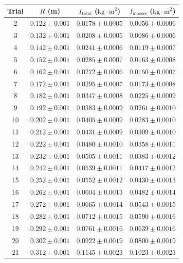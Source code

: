 \documentclass[11pt]{article}
\begin{document}
\begin{table}[h!]
\centering
\small
\begin{tabular}{cccc}
\toprule
\textbf{Trial} & \textbf{$R$ (m)} & \textbf{$I_{\text{total}}$ ($\text{kg}\cdot\text{m}^2$)} & \textbf{$I_{\text{masses}}$ ($\text{kg}\cdot\text{m}^2$)} \\
\midrule
2 & $0.122 \pm 0.001$ & $0.0178 \pm 0.0005$ & $0.0056 \pm 0.0006$ \\
3 & $0.132 \pm 0.001$ & $0.0208 \pm 0.0005$ & $0.0086 \pm 0.0006$ \\
4 & $0.142 \pm 0.001$ & $0.0241 \pm 0.0006$ & $0.0119 \pm 0.0007$ \\
5 & $0.152 \pm 0.001$ & $0.0285 \pm 0.0007$ & $0.0163 \pm 0.0008$ \\
6 & $0.162 \pm 0.001$ & $0.0272 \pm 0.0006$ & $0.0150 \pm 0.0007$ \\
7 & $0.172 \pm 0.001$ & $0.0295 \pm 0.0007$ & $0.0173 \pm 0.0008$ \\
8 & $0.182 \pm 0.001$ & $0.0347 \pm 0.0008$ & $0.0225 \pm 0.0009$ \\
9 & $0.192 \pm 0.001$ & $0.0383 \pm 0.0009$ & $0.0261 \pm 0.0010$ \\
10 & $0.202 \pm 0.001$ & $0.0405 \pm 0.0009$ & $0.0283 \pm 0.0010$ \\
11 & $0.212 \pm 0.001$ & $0.0431 \pm 0.0009$ & $0.0309 \pm 0.0010$ \\
12 & $0.222 \pm 0.001$ & $0.0480 \pm 0.0010$ & $0.0358 \pm 0.0011$ \\
13 & $0.232 \pm 0.001$ & $0.0505 \pm 0.0011$ & $0.0383 \pm 0.0012$ \\
14 & $0.242 \pm 0.001$ & $0.0539 \pm 0.0011$ & $0.0417 \pm 0.0012$ \\
15 & $0.252 \pm 0.001$ & $0.0552 \pm 0.0012$ & $0.0430 \pm 0.0013$ \\
16 & $0.262 \pm 0.001$ & $0.0604 \pm 0.0013$ & $0.0482 \pm 0.0014$ \\
17 & $0.272 \pm 0.001$ & $0.0665 \pm 0.0014$ & $0.0543 \pm 0.0015$ \\
18 & $0.282 \pm 0.001$ & $0.0712 \pm 0.0015$ & $0.0590 \pm 0.0016$ \\
19 & $0.292 \pm 0.001$ & $0.0761 \pm 0.0016$ & $0.0639 \pm 0.0016$ \\
20 & $0.302 \pm 0.001$ & $0.0922 \pm 0.0019$ & $0.0800 \pm 0.0019$ \\
21 & $0.312 \pm 0.001$ & $0.1145 \pm 0.0023$ & $0.1023 \pm 0.0023$ \\
\bottomrule
\end{tabular}
\end{table}
\end{document}
